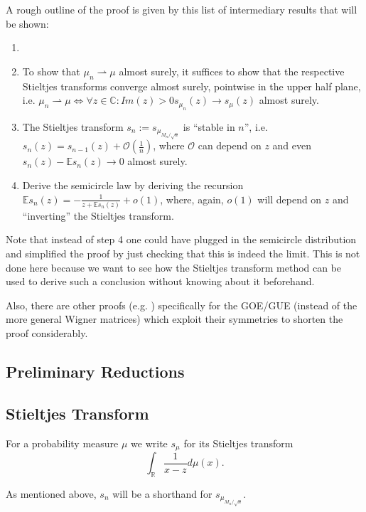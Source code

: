 A rough outline of the proof is given by this list of intermediary results that will be shown:
\begin{enumerate}
	\item {}
	\item To show that $\mu_n\rightharpoonup\mu$ almost surely, it suffices to show that the respective Stieltjes transforms converge almost surely, pointwise in the upper half plane, i.e. $\mu_n\rightharpoonup\mu\Leftrightarrow\forall z\in\mathbb C:Im(z)>0 s_{\mu_n}(z)\rightarrow s_\mu(z)$ almost surely.
	\item The Stieltjes transform $s_n := s_{\mu_{M_n/\sqrt{n}}}$ is ``stable in $n$'', i.e. $s_n(z)=s_{n-1}(z)+\mathcal O(\frac{1}{n})$, where $\mathcal O$ can depend on $z$ and even $s_n(z)-\mathbb E s_n(z)\rightarrow 0$ almost surely.
	\item Derive the semicircle law by deriving the recursion $\mathbb E s_n(z)=-\frac{1}{z+\mathbb E s_n(z)}+o(1)$, where, again, $o(1)$ will depend on $z$ and ``inverting'' the Stieltjes transform.
\end{enumerate}
\begin{remark}
	Note that instead of step 4 one could have plugged in the semicircle distribution and simplified the proof by just checking that this is indeed the limit. This is not done here because we want to see how the Stieltjes transform method can be used to derive such a conclusion without knowing about it beforehand.
	
	Also, there are other proofs (e.g. \cite{scGOE}) specifically for the GOE/GUE (instead of the more general Wigner matrices) which exploit their symmetries to shorten the proof considerably.
\end{remark}

\subsection{Preliminary Reductions}\label{ssec:prelimreduct}

\subsection{Stieltjes Transform}

\begin{definition}
	For a probability measure $\mu$ we write $s_\mu$ for its Stieltjes transform $$\int_\mathbb{R} \frac{1}{x-z}d\mu(x).$$
\end{definition}
As mentioned above, $s_n$ will be a shorthand for $s_{\mu_{M_n/\sqrt{n}}}$.

